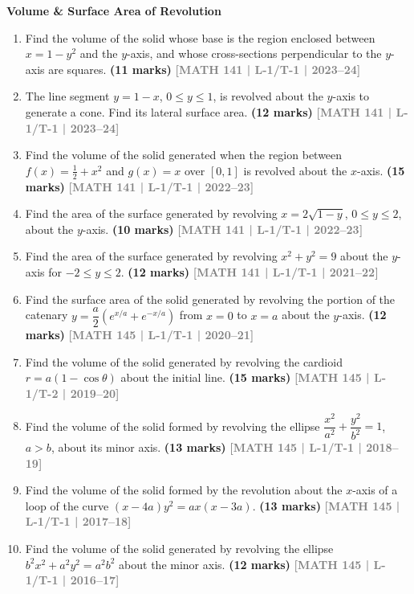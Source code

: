 \documentclass[12pt,a4paper]{article}
\newcommand{\yr}[1]{\hfill\textcolor{gray}{\small\textbf{[#1]}}}
\newcommand{\mk}[1]{\textcolor{orange!70!black}{\small\textbf{(#1 marks)}}}
\newcommand{\subtopic}[2]{%
  \vspace{10pt}
  \noindent\begin{tcolorbox}[colback=#1!8,colframe=#1,boxrule=0.6pt,arc=4pt,
    left=6pt,right=6pt,top=4pt,bottom=4pt]
    \small\bfseries\textcolor{#1}{#2}
  \end{tcolorbox}
  \vspace{2pt}
}
\begin{document}
\subtopic{cB}{Volume \& Surface Area of Revolution}
\label{sub:s2-volume}

\begin{enumerate}\item Find the volume of the solid whose base is the region enclosed between $x=1-y^{2}$ and the $y$-axis, and whose cross-sections perpendicular to the $y$-axis are squares.
\mk{11} \yr{MATH 141 | L-1/T-1 | 2023--24}

\item The line segment $y=1-x$, $0\le y\le 1$, is revolved about the $y$-axis to generate a cone. Find its lateral surface area.
\mk{12} \yr{MATH 141 | L-1/T-1 | 2023--24}

\item Find the volume of the solid generated when the region between $f(x)=\tfrac{1}{2}+x^{2}$ and $g(x)=x$ over $[0,1]$ is revolved about the $x$-axis.
\mk{15} \yr{MATH 141 | L-1/T-1 | 2022--23}

\item Find the area of the surface generated by revolving $x=2\sqrt{1-y}$, $0\le y\le 2$, about the $y$-axis.
\mk{10} \yr{MATH 141 | L-1/T-1 | 2022--23}

\item Find the area of the surface generated by revolving $x^{2}+y^{2}=9$ about the $y$-axis for $-2\le y\le 2$.
\mk{12} \yr{MATH 141 | L-1/T-1 | 2021--22}

\item Find the surface area of the solid generated by revolving the portion of the catenary $y=\dfrac{a}{2}(e^{x/a}+e^{-x/a})$ from $x=0$ to $x=a$ about the $y$-axis.
\mk{12} \yr{MATH 145 | L-1/T-1 | 2020--21}

\item Find the volume of the solid generated by revolving the cardioid $r=a(1-\cos\theta)$ about the initial line.
\mk{15} \yr{MATH 145 | L-1/T-2 | 2019--20}

\item Find the volume of the solid formed by revolving the ellipse $\dfrac{x^{2}}{a^{2}}+\dfrac{y^{2}}{b^{2}}=1$, $a>b$, about its minor axis.
\mk{13} \yr{MATH 145 | L-1/T-1 | 2018--19}

\item Find the volume of the solid formed by the revolution about the $x$-axis of a loop of the curve $(x-4a)y^{2}=ax(x-3a)$.
\mk{13} \yr{MATH 145 | L-1/T-1 | 2017--18}

\item Find the volume of the solid generated by revolving the ellipse $b^{2}x^{2}+a^{2}y^{2}=a^{2}b^{2}$ about the minor axis.
\mk{12} \yr{MATH 145 | L-1/T-1 | 2016--17}


\end{enumerate}
\end{document}
